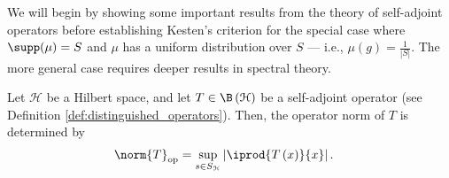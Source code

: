 We will begin by showing some important results from the theory of self-adjoint operators before establishing Kesten's criterion for the special case where $\supp(\mu) = S$ and $\mu$ has a uniform distribution over $S$ --- i.e., $\mu\left( g \right) = \frac{1}{\left\vert S \right\vert}$. The more general case requires deeper results in spectral theory.
\begin{lemma}\label{lemma:norm_self_adjoint_operator}
  Let $\mathcal{H}$ be a Hilbert space, and let $T\in\B\left( \mathcal{H} \right)$ be a self-adjoint operator (see Definition \ref{def:distinguished_operators}). Then, the operator norm of $T$ is determined by
  \begin{align*}
    \norm{T}_{\op} &= \sup_{s\in S_{\mathcal{H}}} \left\vert \iprod{T\left( x \right)}{x} \right\vert.
  \end{align*}
\end{lemma}
